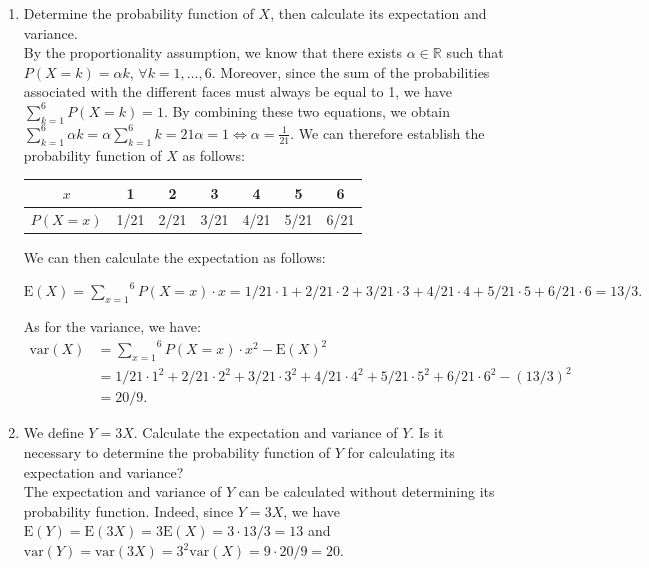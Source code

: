 \documentclass[12pt,thmsa]{article}
\begin{document}
 \begin{enumerate}%
\item Determine the probability function of $X$, then calculate its expectation and variance.\\

By the proportionality assumption, we know that there exists $\alpha \in \mathbb{R}$ such that $P(X=k)=\alpha k$, $\forall k=1,\ldots,6$. Moreover, since the sum of the probabilities associated with the different faces must always be equal to 1, we have $\sum\limits_{k=1}^6 P(X=k)=1$. By combining these two equations, we obtain $\sum\limits_{k=1}^6 \alpha k=\alpha \sum\limits_{k=1}^6 k=21 \alpha=1 \iff \alpha=\frac{1}{21}$. We can therefore establish the probability function of $ X $ as follows:
			\begin{center}
			\begin{tabular}{|c|c|c|c|c|c|c|}
			\hline
			$x$ & 1 & 2 & 3 & 4 & 5 & 6 \\
			\hline
			$P(X=x)$ & 1/21 & 2/21 & 3/21 & 4/21 & 5/21 & 6/21\\
			\hline
			\end{tabular}
			\end{center}

We can then calculate the expectation as follows:

\begin{center}
$\mbox{E}(X) = \overset{6}{\underset{x=1}{\sum}}P(X=x)\cdot x = 1/21\cdot1 + 2/21\cdot 2 + 3/21\cdot3+4/21 \cdot 4 +5/21 \cdot 5+6/21 \cdot 6 =13/3.$
\end{center}

As for the variance, we have:
\begin{equation*}
\begin{split}
\mbox{var}(X) & = \overset{6}{\underset{x=1}{\sum}}P(X=x)\cdot x^2 -\mbox{E}(X)^2 \\
& = 1/21\cdot1^2 + 2/21\cdot 2^2 + 3/21\cdot3^2+4/21 \cdot 4^2 +5/21 \cdot 5^2+6/21 \cdot 6^2 -(13/3)^2 \\
& =20/9.
\end{split}
\end{equation*}

\item We define $Y = 3X$. Calculate the expectation and variance of $Y$. Is it necessary to determine the probability function of $Y$ for calculating its expectation and variance?\\

The expectation and variance of $ Y $ can be calculated without determining its probability function. Indeed, since $Y=3X$, we have $\mbox{E}(Y)=\mbox{E}(3X)=3\mbox{E}(X)=3\cdot 13/3=13$ and $\mbox{var}(Y)=\mbox{var}(3X)=3^2\mbox{var}(X)=9\cdot 20/9=20$.


\end{enumerate}
\end{document}
